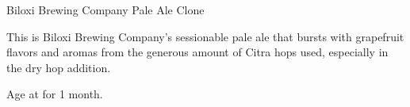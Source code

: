 \begin{recipie}{Biloxi Brewing Company Pale Ale Clone}

\begin{aboutblock}
This is Biloxi Brewing Company's sessionable pale ale that bursts with grapefruit
flavors and aromas from the generous amount of Citra hops used, especially in the
dry hop addition. \sourceaha
\end{aboutblock}


\begin{methodandtiming}
 
\begin{mashsteps}
\end{mashsteps}

\begin{fermentationsteps}
\end{fermentationsteps}

\begin{directions}
Age at  for 1 month.
\end{directions}

\end{methodandtiming}

\pagebreak

\begin{ingredientsblock}

\begin{malts}
\end{malts}

\begin{hops}

\end{hops}


\end{ingredientsblock}

\end{recipie}


